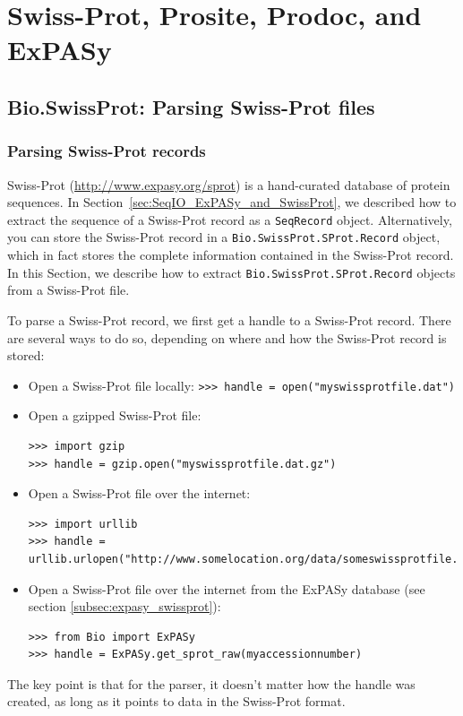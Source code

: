 \documentclass{report}
\begin{document}
\chapter{Swiss-Prot, Prosite, Prodoc, and ExPASy}
\label{chapter:swiss_prot}

\section{Bio.SwissProt: Parsing Swiss-Prot files}

\subsection{Parsing Swiss-Prot records}

Swiss-Prot (\url{http://www.expasy.org/sprot}) is a hand-curated database of protein sequences. In Section~\ref{sec:SeqIO_ExPASy_and_SwissProt}, we described how to extract the sequence of a Swiss-Prot record as a \verb|SeqRecord| object. Alternatively, you can store the Swiss-Prot record in a \verb|Bio.SwissProt.SProt.Record| object, which in fact stores the complete information contained in the Swiss-Prot record. In this Section, we describe how to extract \verb|Bio.SwissProt.SProt.Record| objects from a Swiss-Prot file.

To parse a Swiss-Prot record, we first get a handle to a Swiss-Prot record. There are several ways to do so, depending on where and how the Swiss-Prot record is stored:
\begin{itemize}
\item Open a Swiss-Prot file locally: \newline
\verb|>>> handle = open("myswissprotfile.dat")|
\item Open a gzipped Swiss-Prot file:
\begin{verbatim}
>>> import gzip
>>> handle = gzip.open("myswissprotfile.dat.gz")
\end{verbatim}
\item Open a Swiss-Prot file over the internet:
\begin{verbatim}
>>> import urllib
>>> handle = urllib.urlopen("http://www.somelocation.org/data/someswissprotfile.dat")
\end{verbatim}
\item Open a Swiss-Prot file over the internet from the ExPASy database
(see section \ref{subsec:expasy_swissprot}):
\begin{verbatim}
>>> from Bio import ExPASy
>>> handle = ExPASy.get_sprot_raw(myaccessionnumber)
\end{verbatim}
\end{itemize}
The key point is that for the parser, it doesn't matter how the handle was created, as long as it points to data in the Swiss-Prot format.
\end{document}

